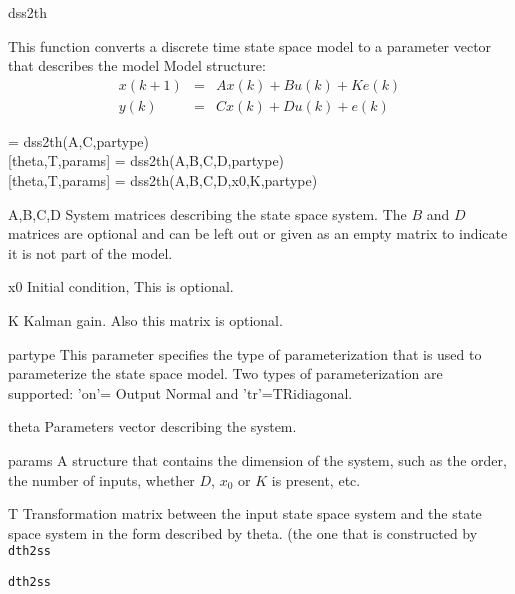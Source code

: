 \documentclass{book}
\newcommand{\dthtoss}{\texttt{dth2ss}}
\begin{document}
\begin{command}{dss2th}
\begin{purpose}
  This function converts a discrete time state space 
  model to a parameter vector that describes the model
  Model structure: 
  \begin{eqnarray*}
    x(k+1) & = &  A x(k) + B u(k)+ Ke(k)\\
    y(k) & = & C x(k) + D u(k) +e(k)
  \end{eqnarray*}
\end{purpose}

\begin{syntax}
   = dss2th(A,C,partype)\\[0pt]
  [theta,T,params] = dss2th(A,B,C,D,partype)\\[0pt]
  [theta,T,params] = dss2th(A,B,C,D,x0,K,partype)
\end{syntax}

\begin{inputs}
\item[A,B,C,D] System matrices describing the state space system.
  The $B$ and $D$ matrices are optional and can be left out or given
  as an empty matrix to indicate it is not part of the model.
\item[x0] Initial condition, This is optional.
\item[K] Kalman gain. Also this matrix is optional.
\item[partype] This parameter specifies the type of parameterization 
  that is used to parameterize the state space model.
  Two types of parameterization are supported:
  'on'= Output Normal and 'tr'=TRidiagonal. 
\end{inputs}
\begin{outputs}
\item[theta] Parameters vector describing the system.
\item[params] A structure that contains the dimension of
  the system, such as the order, the number of inputs, 
  whether $D$, $x_0$ or $K$ is present, etc.
\item[T] Transformation matrix between the input state space system
  and the state space system in the form described by theta.
  (the one that is constructed by {\dthtoss}
\end{outputs}
\begin{seealso}
  {\dthtoss}
\end{seealso}
\end{command}%
  
\end{document}
